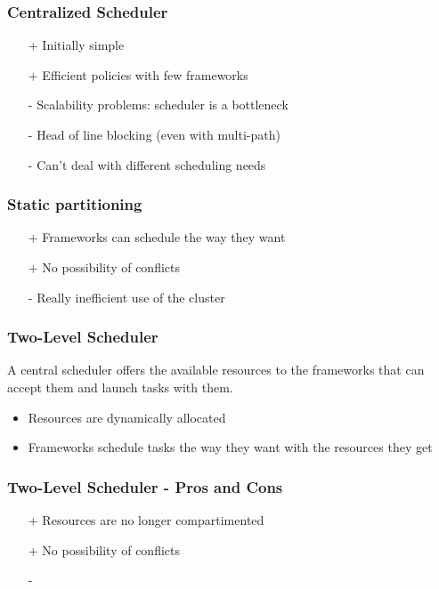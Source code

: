\documentclass{beamer}
\begin{document}
  \begin{frame}
    \frametitle{Centralized Scheduler}
    \begin{itemize}
      \item[+] Initially simple
      \item[+] Efficient policies with few frameworks
      \item[-] Scalability problems: scheduler is a bottleneck
      \item[-] Head of line blocking (even with multi-path)
      \item[-] Can't deal with different scheduling needs
    \end{itemize}
  \end{frame}

  \begin{frame}
    \frametitle{Static partitioning}
    \begin{itemize}
      \item[+] Frameworks can schedule the way they want 
      \item[+] No possibility of conflicts
      \item[-] Really inefficient use of the cluster
    \end{itemize}
  \end{frame}

  \begin{frame}
    \frametitle{Two-Level Scheduler}
    \begin{definition}
      A central scheduler offers the available resources to
      the frameworks that can accept them and launch tasks
      with them.
    \end{definition}
    \begin{itemize}
      \item Resources are dynamically allocated
      \item Frameworks schedule tasks the way they want
        with the resources they get
    \end{itemize}
  \end{frame}

  \begin{frame}
    \frametitle{Two-Level Scheduler - Pros and Cons}
    \begin{itemize}
      \item[+] Resources are no longer compartimented
      \item[+] No possibility of conflicts
      \item[-] 
    \end{itemize}
  \end{frame}
\end{document}
